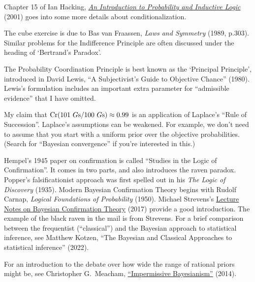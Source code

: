 \begin{sources}

  Chapter 15 of Ian Hacking,
  \href{http://fitelson.org/confirmation/hacking_introduction_to_probability_and_inductive_logic.pdf}{\emph{An Introduction to Probability and Inductive Logic}}
  (2001) goes into some more details about conditionalization.

  The cube exercise is due to Bas van Fraassen, \emph{Laws and Symmetry} (1989,
  p.303). Similar problems for the Indifference Principle are often discussed
  under the heading of `Bertrand's Paradox'. 


  The Probability Coordination Principle is best known as the `Principal
  Principle', introduced in David Lewis, ``A Subjectivist's Guide to Objective
  Chance'' (1980). Lewis's formulation includes an important extra parameter for
  ``admissible evidence'' that I have omitted. 

  My claim that $\text{Cr}(\text{101 }G\text{s} / \text{100 }G\text{s}) \approx 0.99$
  is an application of Laplace's ``Rule of Succession''. Laplace's assumptions
  can be weakened. For example, we don't need to assume that you start with a
  uniform prior over the objective probabilities. (Search for ``Bayesian
  convergence'' if you're interested in this.)
  
  Hempel's 1945 paper on confirmation is called ``Studies in the Logic of
  Confirmation''. It comes in two parts, and also introduces the raven paradox.
  Popper's falsificationist approach was first spelled out in his \emph{The
    Logic of Discovery} (1935). Modern Bayesian Confirmation Theory begins with
  Rudolf Carnap, \emph{Logical Foundations of Probability} (1950). Michael
  Strevens's
  \href{http://www.strevens.org/bct/BCT.pdf}{Lecture Notes on Bayesian Confirmation Theory}
  (2017) provide a good introduction. The example of the black raven in the mail
  is from Strevens. For a brief comparison between the frequentist
  (``classical'') and the Bayesian approach to statistical inference, see
  Matthew Kotzen, ``The Bayesian and Classical Approaches to statistical
  inference'' (2022).

  For an introduction to the debate over how wide the range of rational
  priors might be, see Christopher G.\ Meacham,
  \href{http://people.umass.edu/cmeacham/Meacham.Impermissive.Bayesiansim.pdf}{``Impermissive Bayesianism''}
  (2014).



  
\end{sources}


